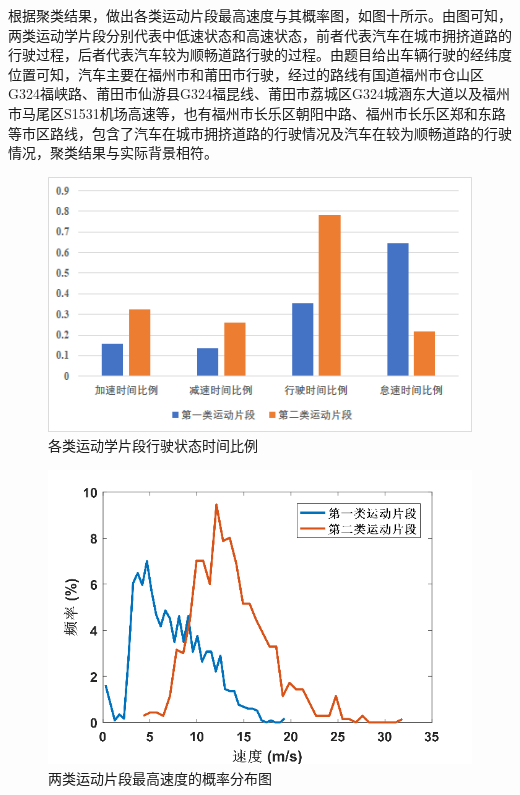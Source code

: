 \documentclass[bwprint]{gmcmthesis}
\begin{document}
根据聚类结果，做出各类运动片段最高速度与其概率图，如图十所示。由图可知，两类运动学片段分别代表中低速状态和高速状态，前者代表汽车在城市拥挤道路的行驶过程，后者代表汽车较为顺畅道路行驶的过程。由题目给出车辆行驶的经纬度位置可知，汽车主要在福州市和莆田市行驶，经过的路线有国道福州市仓山区G324福峡路、莆田市仙游县G324福昆线、莆田市荔城区G324城涵东大道以及福州市马尾区S1531机场高速等，也有福州市长乐区朝阳中路、福州市长乐区郑和东路等市区路线，包含了汽车在城市拥挤道路的行驶情况及汽车在较为顺畅道路的行驶情况，聚类结果与实际背景相符。
\begin{figure}[htbp] %
\centering
\includegraphics[width=0.9\linewidth,angle=0]{figures/rate.png}
\caption{各类运动学片段行驶状态时间比例}
\label{f5}
\end{figure}

\begin{figure}[htbp] %
\centering
\includegraphics[width=0.9\linewidth,angle=0]{figures/max.png}
\caption{两类运动片段最高速度的概率分布图}
\label{f5}
\end{figure}
\end{document}
